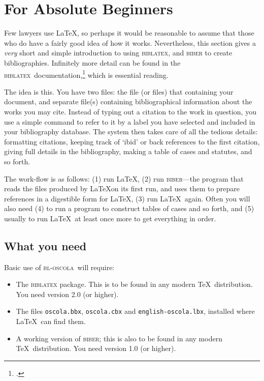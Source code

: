 \documentclass[a5paper,fontsize=9pt,DIV=1]{scrartcl}
\newcommand{\oscola}{\textsc{bl-oscola}}
\newcommand{\biblatex}{\textsc{biblatex}}
\begin{document}
\section{For Absolute Beginners}

Few lawyers use \LaTeX,
so perhaps it would be reasonable to assume that those who do have a
fairly good idea of how it works. Nevertheless, this section gives a
\emph{very} short and simple introduction to using \biblatex, and
\textsc{biber} to create bibliographies. Infinitely more detail can be
found in the \biblatex\ documentation,\footcite{biblatex2} which is
essential reading.

The idea is this. You have two files: the file (or files) that
containing your document, and separate file(s) containing
bibliographical information about the works you may cite. Instead of
typing out a citation to the work in question, you use a simple
command to refer to it by a label you have selected and included in
your bibliography database. The system then takes care of all the
tedious details: formatting citations, keeping track of `ibid' or back
references to the first citation, giving full details in the
bibliography, making a table of cases and statutes, and so forth.

The work-flow is as follows: (1)
run \LaTeX, (2) run \textsc{biber}---the program that reads the files
produced by \LaTeX on its first run, and uses them to prepare
references in a digestible form for \LaTeX, (3) run \LaTeX\
again. Often you will also need (4) to run a program to construct
tables of cases and so forth, and (5) usually to run \LaTeX\ at least
once more to get everything in
order.

\subsection{What you need}

Basic use of \oscola\ will require:
\begin{itemize}
\item The \textsc{biblatex} package. This is to be found in any modern
  \TeX\ distribution. You need version 2.0 (or higher).
\item The files \texttt{oscola.bbx}, \texttt{oscola.cbx} and
  \texttt{english-oscola.lbx}, installed where \LaTeX\ can find them.
\item A working version of \textsc{biber}; this is also to be found in
  any modern \TeX\ distribution. You need version 1.0 (or higher).
\end{itemize}
\end{document}
